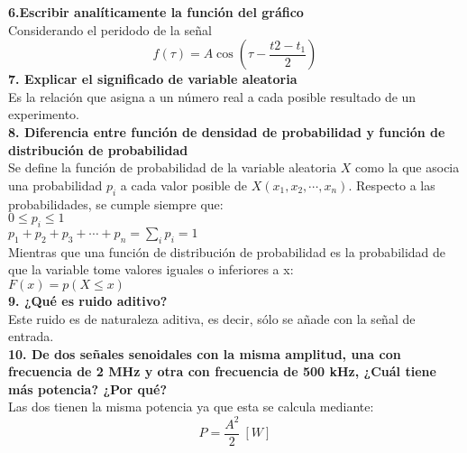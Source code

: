 \textbf{6.Escribir analíticamente la función del gráfico}\\
Considerando el peridodo de la señal
\begin{equation}
	f(\tau) = A \cos (\tau-\frac{t2-t_1}{2})
\end{equation}
\textbf{7. Explicar el significado de variable aleatoria} \\

Es la relación que asigna a un número real a cada posible resultado de un experimento.\\

\textbf{8. Diferencia entre función de densidad de probabilidad y función de distribución de probabilidad} \\

Se define la función de probabilidad de la variable aleatoria $X$ como la que asocia una probabilidad $p_i$ a cada valor posible de  $X(x_1,x_2,\cdots,x_n)$. Respecto a las probabilidades, se cumple siempre que: \\
$0 \leq p_i \leq 1$ \\
$p_1+p_2+p_3+\cdots + p_n = \sum_i p_i =1$ \\

Mientras que una función de distribución de probabilidad es  la probabilidad de que la variable tome valores iguales o inferiores a x: \\
$F(x)=p(X\leq x)$ \\

\textbf{9. ¿Qué es ruido aditivo? } \\

Este ruido es de naturaleza aditiva, es decir, sólo se añade con la señal de entrada.\\

\textbf{10. De dos señales senoidales con la misma amplitud, una con frecuencia de 2 MHz y otra con frecuencia de 500 kHz, ¿Cuál tiene más potencia? ¿Por qué?} \\

Las dos tienen la misma potencia ya que esta se calcula mediante: 
\begin{equation}
 P = \frac{A^2}{2} \ [W]
\end{equation}

